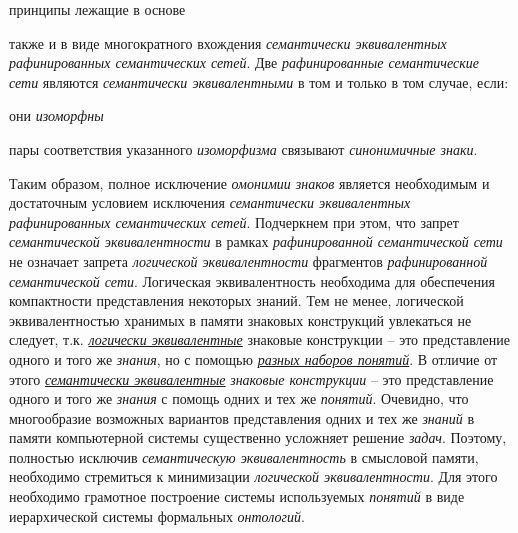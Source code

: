 \begin{SCn}
\begin{scnsubstruct}
\begin{scnrelfromvector}{принципы лежащие в основе}
{				также и в виде многократного вхождения \textit{семантически эквивалентных}
				\textit{рафинированных семантических сетей}. Две \textit{рафинированные
					семантические сети} являются \textit{семантически эквивалентными} в том и
				только в том случае, если:
				\begin{scnitemize}
					\item они \textit{изоморфны}
					\item пары соответствия указанного \textit{изоморфизма}
					связывают \textit{синонимичные знаки}.
				\end{scnitemize}
				Таким образом, полное исключение \textit{омонимии знаков}
				является необходимым и достаточным условием исключения \textit{семантически
					эквивалентных рафинированных семантических сетей}. Подчеркнем при этом, что
				запрет \textit{семантической эквивалентности} в рамках \textit{рафинированной
					семантической сети} не означает запрета \textit{логической эквивалентности}
				фрагментов \textit{рафинированной семантической сети}. Логическая
				эквивалентность необходима для обеспечения компактности представления некоторых
				знаний. Тем не менее, логической эквивалентностью хранимых в памяти знаковых
				конструкций увлекаться не следует, т.к. \uline{\textit{логически
						эквивалентные}} знаковые конструкции -- это представление одного и того же
				\textit{знания}, но с помощью \uline{\textit{разных наборов понятий}}. В
				отличие от этого \uline{\textit{семантически эквивалентные}} \textit{знаковые
					конструкции} -- это представление одного и того же \textit{знания} с помощь
				одних и тех же \textit{понятий}. Очевидно, что многообразие возможных вариантов
				представления одних и тех же \textit{знаний} в памяти компьютерной системы
				существенно усложняет решение \textit{задач}. Поэтому, полностью исключив
				\textit{семантическую эквивалентность} в смысловой памяти, необходимо
				стремиться к минимизации \textit{логической эквивалентности}. Для этого
				необходимо грамотное построение системы используемых \textit{понятий} в виде
				иерархической системы формальных \textit{онтологий}.
				}
\end{scnrelfromvector}
\end{scnsubstruct}
\end{SCn}
